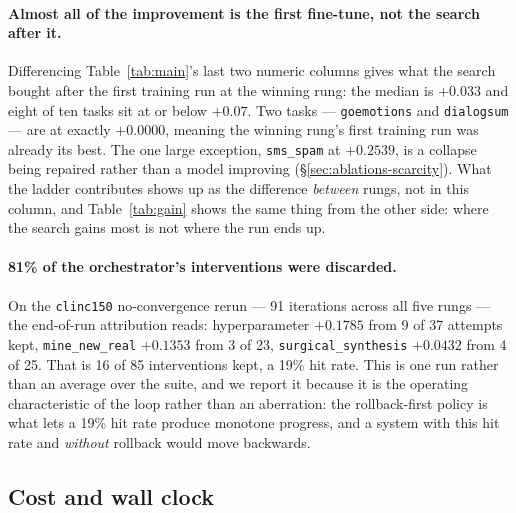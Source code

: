 \documentclass[sigconf,10pt]{acmart}
\newcommand{\xref}[1]{\S\ref{#1}}
\newcommand{\tsk}[1]{\texttt{#1}}
\begin{document}
\paragraph{Almost all of the improvement is the first fine-tune, not the search after it.}
Differencing Table~\ref{tab:main}'s last two numeric columns gives what the search bought
after the first training run at the winning rung: the median is $+0.033$ and eight of ten
tasks sit at or below $+0.07$. Two tasks --- \tsk{goemotions} and \tsk{dialogsum} --- are at
exactly $+0.0000$, meaning the winning rung's first training run was already its best. The
one large exception, \tsk{sms\_spam} at $+0.2539$, is a collapse being repaired rather than a
model improving (\xref{sec:ablations-scarcity}). What the ladder contributes shows up as the
difference \emph{between} rungs, not in this column, and Table~\ref{tab:gain} shows the same
thing from the other side: where the search gains most is not where the run ends up.

\paragraph{81\% of the orchestrator's interventions were discarded.} On the \tsk{clinc150}
no-convergence rerun --- 91 iterations across all five rungs --- the end-of-run attribution
reads: hyperparameter $+0.1785$ from 9 of 37 attempts kept, \texttt{mine\_new\_real}
$+0.1353$ from 3 of 23, \texttt{surgical\_synthesis} $+0.0432$ from 4 of 25. That is 16 of 85
interventions kept, a 19\% hit rate. This is one run rather than an average over the suite,
and we report it because it is the operating characteristic of the loop rather than an
aberration: the rollback-first policy is what lets a 19\% hit rate produce monotone progress,
and a system with this hit rate and \emph{without} rollback would move backwards.

\subsection{Cost and wall clock}
\end{document}
